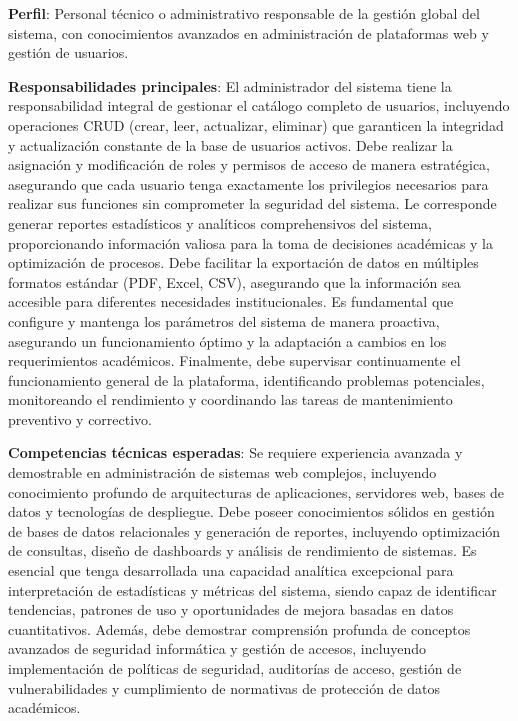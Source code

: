 \documentclass[12pt,a4paper,oneside]{report}
\begin{document}
\textbf{Perfil}: Personal técnico o administrativo responsable de la
gestión global del sistema, con conocimientos avanzados en
administración de plataformas web y gestión de usuarios.

\textbf{Responsabilidades principales}: El administrador del sistema tiene la responsabilidad integral de gestionar el catálogo completo de usuarios, incluyendo operaciones CRUD (crear, leer, actualizar, eliminar) que garanticen la integridad y actualización constante de la base de usuarios activos. Debe realizar la asignación y modificación de roles y permisos de acceso de manera estratégica, asegurando que cada usuario tenga exactamente los privilegios necesarios para realizar sus funciones sin comprometer la seguridad del sistema. Le corresponde generar reportes estadísticos y analíticos comprehensivos del sistema, proporcionando información valiosa para la toma de decisiones académicas y la optimización de procesos. Debe facilitar la exportación de datos en múltiples formatos estándar (PDF, Excel, CSV), asegurando que la información sea accesible para diferentes necesidades institucionales. Es fundamental que configure y mantenga los parámetros del sistema de manera proactiva, asegurando un funcionamiento óptimo y la adaptación a cambios en los requerimientos académicos. Finalmente, debe supervisar continuamente el funcionamiento general de la plataforma, identificando problemas potenciales, monitoreando el rendimiento y coordinando las tareas de mantenimiento preventivo y correctivo.

\textbf{Competencias técnicas esperadas}: Se requiere experiencia avanzada y demostrable en administración de sistemas web complejos, incluyendo conocimiento profundo de arquitecturas de aplicaciones, servidores web, bases de datos y tecnologías de despliegue. Debe poseer conocimientos sólidos en gestión de bases de datos relacionales y generación de reportes, incluyendo optimización de consultas, diseño de dashboards y análisis de rendimiento de sistemas. Es esencial que tenga desarrollada una capacidad analítica excepcional para interpretación de estadísticas y métricas del sistema, siendo capaz de identificar tendencias, patrones de uso y oportunidades de mejora basadas en datos cuantitativos. Además, debe demostrar comprensión profunda de conceptos avanzados de seguridad informática y gestión de accesos, incluyendo implementación de políticas de seguridad, auditorías de acceso, gestión de vulnerabilidades y cumplimiento de normativas de protección de datos académicos.
\end{document}
